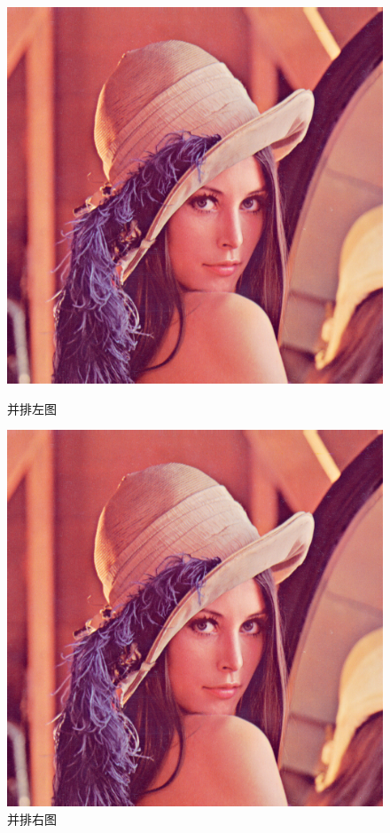 \begin{figure}[htbp]
    \begin{minipage}{0.5\linewidth}
        \centering
        \includegraphics[width=0.9\linewidth]{img/lena.png}
        \caption{并排左图}
        \label{fig:double:left}
    \end{minipage}
    \begin{minipage}{0.5\linewidth}
        \centering
        \includegraphics[width=0.9\linewidth]{img/lena.png}
        \caption{并排右图}
        \label{fig:double:right}
    \end{minipage}
\end{figure}
